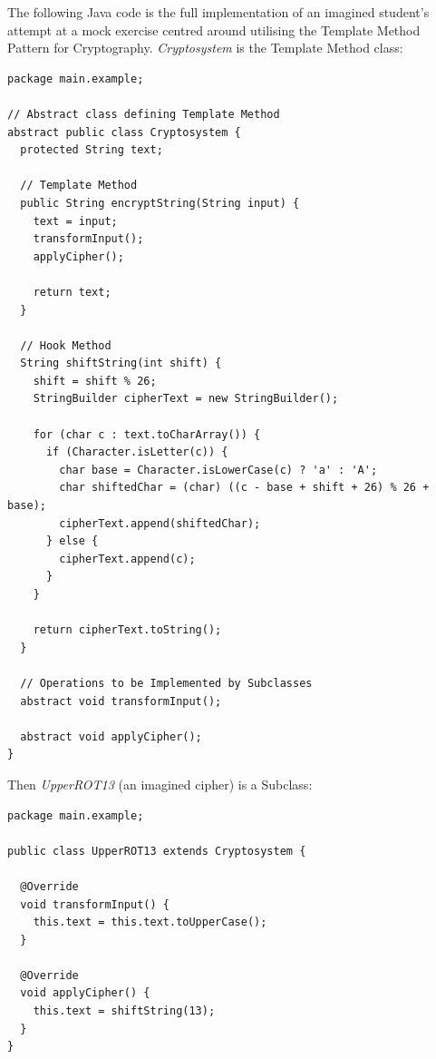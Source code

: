 \appendix
{}
\label{chapter:appendix}
The following Java code is the full implementation of an imagined student's attempt at a mock exercise centred around utilising the Template Method Pattern for Cryptography. \emph{Cryptosystem} is the Template Method class:

\begin{listing}[H]
\begin{verbatim}
package main.example;

// Abstract class defining Template Method
abstract public class Cryptosystem {
  protected String text;

  // Template Method
  public String encryptString(String input) {
    text = input;
    transformInput();
    applyCipher();

    return text;
  }

  // Hook Method
  String shiftString(int shift) {
    shift = shift % 26;
    StringBuilder cipherText = new StringBuilder();

    for (char c : text.toCharArray()) {
      if (Character.isLetter(c)) {
        char base = Character.isLowerCase(c) ? 'a' : 'A';
        char shiftedChar = (char) ((c - base + shift + 26) % 26 + base);
        cipherText.append(shiftedChar);
      } else {
        cipherText.append(c);
      }
    }

    return cipherText.toString();
  }

  // Operations to be Implemented by Subclasses
  abstract void transformInput();
  
  abstract void applyCipher();
}
\end{verbatim}
\caption{Cryptosystem.java}
\label{lst:sample-cryptosystem}
\end{listing}

Then \emph{UpperROT13} (an imagined cipher) is a Subclass:

\begin{listing}[H]
\begin{verbatim}
package main.example;

public class UpperROT13 extends Cryptosystem {

  @Override
  void transformInput() {
    this.text = this.text.toUpperCase();
  }

  @Override
  void applyCipher() {
    this.text = shiftString(13);
  }
}
\end{verbatim}
\caption{UpperROT13.java}
\label{lst:sample-UpperROT13}
\end{listing}

